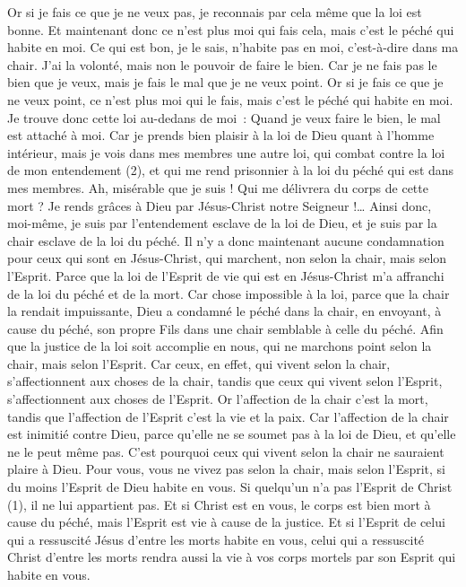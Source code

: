 \begin{multicols}{2}
Or si je fais ce que je ne veux pas, je reconnais par cela même que la loi est bonne.
Et maintenant donc ce n'est plus moi qui fais cela, mais c'est le péché qui habite en moi.
Ce qui est bon, je le sais, n’habite pas en moi, c’est-à-dire dans ma chair. J’ai la volonté, mais non le pouvoir de faire le bien.
Car je ne fais pas le bien que je veux, mais je fais le mal que je ne veux point.
Or si je fais ce que je ne veux point, ce n'est plus moi qui le fais, mais c'est le péché qui habite en moi.
Je trouve donc cette loi au-dedans de moi : Quand je veux faire le bien, le mal est attaché à moi.
Car je prends bien plaisir à la loi de Dieu quant à l'homme intérieur,
mais je vois dans mes membres une autre loi, qui combat contre la loi de mon entendement (2), et qui me rend prisonnier à la loi du péché qui est dans mes membres.
Ah, misérable que je suis ! Qui me délivrera du corps de cette mort ?
Je rends grâces à Dieu par Jésus-Christ notre Seigneur !… Ainsi donc, moi-même, je suis par l’entendement esclave de la loi de Dieu, et je suis par la chair esclave de la loi du péché.
\VerseOne{}Il n'y a donc maintenant aucune condamnation pour ceux qui sont en Jésus-Christ, qui marchent, non selon la chair, mais selon l'Esprit.
Parce que la loi de l'Esprit de vie qui est en Jésus-Christ m'a affranchi de la loi du péché et de la mort.
Car chose impossible à la loi, parce que la chair la rendait impuissante, Dieu a condamné le péché dans la chair, en envoyant, à cause du péché, son propre Fils dans une chair semblable à celle du péché.
Afin que la justice de la loi soit accomplie en nous, qui ne marchons point selon la chair, mais selon l'Esprit.
Car ceux, en effet, qui vivent selon la chair, s’affectionnent aux choses de la chair, tandis que ceux qui vivent selon l'Esprit, s’affectionnent aux choses de l'Esprit.
Or l'affection de la chair c’est la mort, tandis que l'affection de l'Esprit c’est la vie et la paix.
Car l'affection de la chair est inimitié contre Dieu, parce qu’elle ne se soumet pas à la loi de Dieu, et qu’elle ne le peut même pas.
C'est pourquoi ceux qui vivent selon la chair ne sauraient plaire à Dieu.
Pour vous, vous ne vivez pas selon la chair, mais selon l'Esprit, si du moins l'Esprit de Dieu habite en vous. Si quelqu'un n'a pas l'Esprit de Christ (1), il ne lui appartient pas.
Et si Christ est en vous, le corps est bien mort à cause du péché, mais l'Esprit est vie à cause de la justice.
Et si l'Esprit de celui qui a ressuscité Jésus d’entre les morts habite en vous, celui qui a ressuscité Christ d’entre les morts rendra aussi la vie à vos corps mortels par son Esprit qui habite en vous.

\end{multicols}
